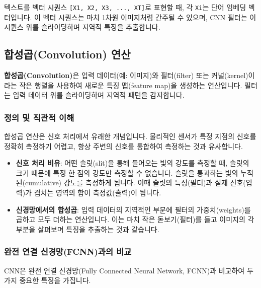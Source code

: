 \documentclass[11pt,a4paper]{article}
\theoremstyle{definition}
\begin{document}
\begin{tcolorbox}[examplebox, title=\textbf{예시}]
텍스트를 벡터 시퀀스 \texttt{[X1, X2, X3, ..., XT]}로 표현할 때, 각 \texttt{Xi}는 단어 임베딩 벡터입니다. 이 벡터 시퀀스는 마치 1차원 이미지처럼 간주될 수 있으며, CNN 필터는 이 시퀀스 위를 슬라이딩하며 지역적 특징을 추출합니다.
\end{tcolorbox}

\subsection{합성곱(Convolution) 연산}

\begin{tcolorbox}[conceptbox, title=\textbf{핵심 개념}]
\textbf{합성곱(Convolution)}은 입력 데이터(예: 이미지)와 필터(filter) 또는 커널(kernel)이라는 작은 행렬을 사용하여 새로운 특징 맵(feature map)을 생성하는 연산입니다. 필터는 입력 데이터 위를 슬라이딩하며 지역적 패턴을 감지합니다.
\end{tcolorbox}

\subsubsection{정의 및 직관적 이해}
합성곱 연산은 신호 처리에서 유래한 개념입니다. 물리적인 센서가 특정 지점의 신호를 정확히 측정하기 어렵고, 항상 주변의 신호를 통합하여 측정하는 것과 유사합니다.

\begin{itemize}
    \item \textbf{신호 처리 비유}: 어떤 슬릿(slit)을 통해 들어오는 빛의 강도를 측정할 때, 슬릿의 크기 때문에 특정 한 점의 강도만 측정할 수 없습니다. 슬릿을 통과하는 빛의 누적된(cumulative) 강도를 측정하게 됩니다. 이때 슬릿의 특성(필터)과 실제 신호(입력)가 겹치는 영역의 합이 측정값(출력)이 됩니다.
    \item \textbf{신경망에서의 합성곱}: 입력 데이터의 지역적인 부분에 필터의 가중치(weights)를 곱하고 모두 더하는 연산입니다. 이는 마치 작은 돋보기(필터)를 들고 이미지의 각 부분을 살펴보며 특징을 추출하는 것과 같습니다.
\end{itemize}

\subsubsection{완전 연결 신경망(FCNN)과의 비교}
CNN은 완전 연결 신경망(Fully Connected Neural Network, FCNN)과 비교하여 두 가지 중요한 특징을 가집니다.
\end{document}
